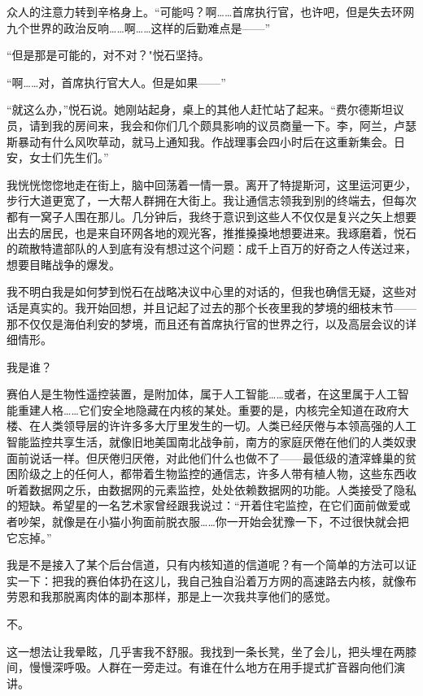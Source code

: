 \documentclass[AutoFakeBold=true]{book}
\begin{document}
众人的注意力转到辛格身上。``可能吗？啊……首席执行官，也许吧，但是失去环网九个世界的政治反响……啊……这样的后勤难点是——''

``但是那是可能的，对不对？"悦石坚持。

``啊……对，首席执行官大人。但是如果——''

``就这么办，''悦石说。她刚站起身，桌上的其他人赶忙站了起来。``费尔德斯坦议员，请到我的房间来，我会和你们几个颇具影响的议员商量一下。李，阿兰，卢瑟斯暴动有什么风吹草动，就马上通知我。作战理事会四小时后在这重新集会。日安，女士们先生们。''

\vspace*{1em}

我恍恍惚惚地走在街上，脑中回荡着一情一景。离开了特提斯河，这里运河更少，步行大道更宽了，一大帮人群拥在大街上。我让通信志领我到别的终端去，但每次都有一窝子人围在那儿。几分钟后，我终于意识到这些人不仅仅是复兴之矢上想要出去的居民，也是来自环网各地的观光客，推推搡搡地想要进来。我琢磨着，悦石的疏散特遣部队的人到底有没有想过这个问题：成千上百万的好奇之人传送过来，想要目睹战争的爆发。

我不明白我是如何梦到悦石在战略决议中心里的对话的，但我也确信无疑，这些对话是真实的。我开始回想，并且记起了过去的那个长夜里我的梦境的细枝末节——那不仅仅是海伯利安的梦境，而且还有首席执行官的世界之行，以及高层会议的详细情形。

{\kaishu 我是谁？}

赛伯人是生物性遥控装置，是附加体，属于人工智能……或者，在这里属于人工智能重建人格……它们安全地隐藏在内核的某处。重要的是，内核完全知道在政府大楼、在人类领导层的许许多多大厅里发生的一切。人类已经厌倦与本领高强的人工智能监控共享生活，就像旧地美国南北战争前，南方的家庭厌倦在他们的人类奴隶面前说话一样。但厌倦归厌倦，对此他们什么也做不了——最低级的渣滓蜂巢的贫困阶级之上的任何人，都带着生物监控的通信志，许多人带有植人物，这些东西收听着数据网之乐，由数据网的元素监控，处处依赖数据网的功能。人类接受了隐私的短缺。希望星的一名艺术家曾经跟我说过：``开着住宅监控，在它们面前做爱或者吵架，就像是在小猫小狗面前脱衣服……你一开始会犹豫一下，不过很快就会把它忘掉。''

我是不是接入了某个后台信道，只有内核知道的信道呢？有一个简单的方法可以证实一下：把我的赛伯体扔在这儿，我自己独自沿着万方网的高速路去内核，就像布劳恩和我那脱离肉体的副本那样，那是上一次我共享他们的感觉。

{\kaishu 不。}

这一想法让我晕眩，几乎害我不舒服。我找到一条长凳，坐了会儿，把头埋在两膝间，慢慢深呼吸。人群在一旁走过。有谁在什么地方在用手提式扩音器向他们演讲。
\end{document}
